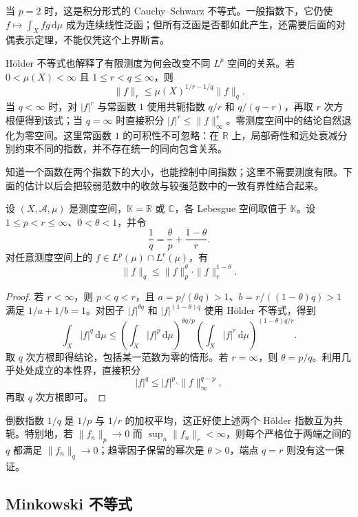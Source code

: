 当 \(p=2\) 时，这是积分形式的 Cauchy--Schwarz 不等式。一般指数下，它仍使 \(f\mapsto\int_Xfg\,\mathrm d\mu\) 成为连续线性泛函；但所有泛函是否都如此产生，还需要后面的对偶表示定理，不能仅凭这个上界断言。

\ProseParagraphBreak

Hölder 不等式也解释了有限测度为何会改变不同 \(L^p\) 空间的关系。若 \(0<\mu(X)<\infty\) 且 \(1\leq r<q\leq\infty\)，则
\[
 \|f\|_r\leq\mu(X)^{1/r-1/q}\|f\|_q.
\]
当 \(q<\infty\) 时，对 \(|f|^r\) 与常函数 \(1\) 使用共轭指数 \(q/r\) 和 \(q/(q-r)\)，再取 \(r\) 次方根便得到该式；当 \(q=\infty\) 时直接积分 \(|f|^r\leq\|f\|_\infty^r\)。零测度空间中的结论自然退化为零空间。这里常函数 \(1\) 的可积性不可忽略：在 \(\mathbb R\) 上，局部奇性和远处衰减分别约束不同的指数，并不存在统一的同向包含关系。

知道一个函数在两个指数下的大小，也能控制中间指数；这里不需要测度有限。下面的估计以后会把较弱范数中的收敛与较强范数中的一致有界性结合起来。

\begin{proposition}[指数插值]\label{b1:prop:lp-interpolation}
设 \((X,\mathcal A,\mu)\) 是测度空间，\(\mathbb K=\mathbb R\) 或 \(\mathbb C\)，各 Lebesgue 空间取值于 \(\mathbb K\)。设 \(1\le p<r\le\infty\)、\(0<\theta<1\)，并令
\[
 \frac1q=\frac\theta p+\frac{1-\theta}r.
\]
对任意测度空间上的 \(f\in L^p(\mu)\cap L^r(\mu)\)，有
\[
 \|f\|_q\le\|f\|_p^\theta\cdot\|f\|_r^{1-\theta}.
\]
\end{proposition}
\begin{proof}
若 \(r<\infty\)，则 \(p<q<r\)，且
\(a=p/(\theta q)>1\)、\(b=r/((1-\theta)q)>1\) 满足 \(1/a+1/b=1\)。对因子 \(|f|^{\theta q}\) 和 \(|f|^{(1-\theta)q}\) 使用 Hölder 不等式，得到
\[
 \int_X|f|^q\,\mathrm d\mu
 \le\left(\int_X|f|^p\,\mathrm d\mu\right)^{\theta q/p}
 \left(\int_X|f|^r\,\mathrm d\mu\right)^{(1-\theta)q/r}.
\]
取 \(q\) 次方根即得结论，包括某一范数为零的情形。若 \(r=\infty\)，则 \(\theta=p/q\)。利用几乎处处成立的本性界，直接积分
\[
 |f|^q\le |f|^p\cdot\|f\|_\infty^{q-p},
\]
再取 \(q\) 次方根即可。
\end{proof}

倒数指数 \(1/q\) 是 \(1/p\) 与 \(1/r\) 的加权平均，这正好使上述两个 Hölder 指数互为共轭。特别地，若 \(\|f_n\|_p\to0\) 而 \(\sup_n\|f_n\|_r<\infty\)，则每个严格位于两端之间的 \(q\) 都满足 \(\|f_n\|_q\to0\)；趋零因子保留的幂次是 \(\theta>0\)，端点 \(q=r\) 则没有这一保证。

\subsection{Minkowski 不等式}
\label{b1:subsec:100104}

